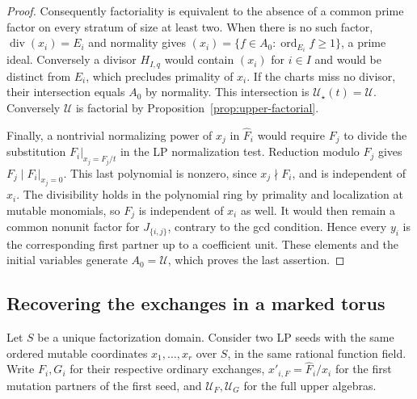 \documentclass[11pt,reqno]{amsart}
\numberwithin{equation}{section}
\theoremstyle{definition}
\theoremstyle{remark}
\DeclareMathOperator{\ord}{ord}
\begin{document}
\begin{proof}
Consequently factoriality is equivalent to the absence of a common
prime factor on every stratum of size at least two. When there is
no such factor, \(\operatorname{div}(x_i)=E_i\) and normality gives
\((x_i)=\{f\in A_0:\ord_{E_i}f\ge1\}\), a prime ideal. Conversely
a divisor \(H_{I,q}\) would contain \((x_i)\) for \(i\in I\) and
would be distinct from \(E_i\), which precludes primality of \(x_i\).
If the charts miss no divisor, their intersection equals \(A_0\)
by normality. This intersection is \(\mathcal U_\star(t)=\mathcal U\).
Conversely \(\mathcal U\) is factorial by
Proposition~\ref{prop:upper-factorial}.

Finally, a nontrivial normalizing power of \(x_j\) in \(\widehat F_i\)
would require \(F_j\) to divide the substitution
\(F_i|_{x_j=F_j/t}\) in the LP normalization test. Reduction modulo
\(F_j\) gives \(F_j\mid F_i|_{x_j=0}\). This last polynomial is
nonzero, since \(x_j\nmid F_i\), and is independent of \(x_i\).
The divisibility holds in the polynomial ring by primality and
localization at mutable monomials, so \(F_j\) is independent of
\(x_i\) as well. It would then remain a common nonunit factor for
\(J_{\{i,j\}}\), contrary to the gcd condition. Hence every \(y_i\)
is the corresponding first partner up to a coefficient unit. These
elements and the initial variables generate \(A_0=\mathcal U\),
which proves the last assertion.
\end{proof}

\subsection{Recovering the exchanges in a marked torus}

Let \(S\) be a unique factorization domain. Consider two LP seeds
with the same ordered mutable coordinates \(x_1,\dots,x_r\) over
\(S\), in the same rational function field. Write \(F_i,G_i\) for
their respective ordinary exchanges, \(x'_{i,F}=\widehat F_i/x_i\)
for the first mutation partners of the first seed, and
\(\mathcal U_F,\mathcal U_G\) for the full upper algebras.
\end{document}
